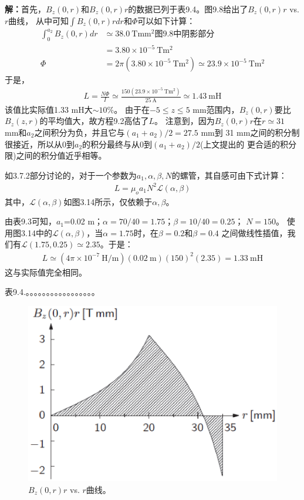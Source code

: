 \textbf{解：}首先，$B_z(0,r)$和$B_z(0,r)r$的数据已列于表9.4。图9.8给出了$B_z(0,r)r$ vs. $r$曲线，
从中可知$\int B_z(0,r)rdr$和$\Phi$可以如下计算：
\begin{align*}%
\int_{0}^{a_2}B_z(0,r)dr&\simeq 38.0\ \mathrm{T mm^2}\mbox{图9.8中阴影部分}\\
&=3.80\times 10^{-5}\ \mathrm{Tm^2}\\
\Phi&=2\pi(3.80\times 10^{-5}\ \mathrm{Tm^2})\simeq 23.9\times 10^{-5}\ \mathrm{Tm^2}
\end{align*}
于是，
\begin{align*}%
L=\frac{N\Phi}{I}\simeq\frac{150(23.9\times 10^{-5}\ \mathrm{Tm^2})}{25\ \mathrm{A}}\simeq 1.43\ \mathrm{mH}
\end{align*}
该值比实际值1.33 mH大$\sim 10\%$。
由于在$-5\le z\le 5$ mm范围内，$B_z(0,r)$要比$B_z(z,r)$的平均值大，故方程9.2高估了$L$。
注意到，因为$B_z(0,r)r$在$r\simeq31$ mm和$a_2$之间积分为负，并且它与$(a_1+a_2)/2=27.5$ mm到
31 mm之间的积分制很接近，所以从0到$a_2$的积分最终与从0到$(a_1+a_2)/2$(上文提出的
更合适的积分限)之间的积分值近乎相等。

如3.7.2部分讨论的，对于一个参数为$a_1,\alpha,\beta,N$的螺管，其自感可由下式计算：
\begin{align*}%
L=\mu_oa_1N^2\mathcal{L}(\alpha,\beta) \tag{3.81}
\end{align*}
其中，$\mathcal{L}(\alpha,\beta)$如图3.14所示，仅依赖于$\alpha,\beta$。

由表9.3可知，$a_1$=0.02 m；$\alpha=70/40=1.75$；$\beta=10/40=0.25$；
$N=150$。
使用图3.14中的$\mathcal{L}(\alpha,\beta)$，当$\alpha=1.75$时，在$\beta=0.2$和$\beta=0.4$
之间做线性插值，我们有$\mathcal{L}(1.75,0.25)\simeq2.35$。于是：
\begin{align*}%
L\simeq(4\pi\times 10^{-7}\ \mathrm{H/m})(0.02\ \mathrm{m})(150)^2(2.35)=1.33\ \mathrm{mH}
\end{align*}
这与实际值完全相同。


表9.4.。。。。。。。。。。。。。。。。。


\begin{figure}
	\centering
	\includegraphics[scale=0.6]{chpt9/figs/fig9.8.eps}
	\caption{$B_z(0,r)r$ vs. $r$曲线。}
\end{figure}

